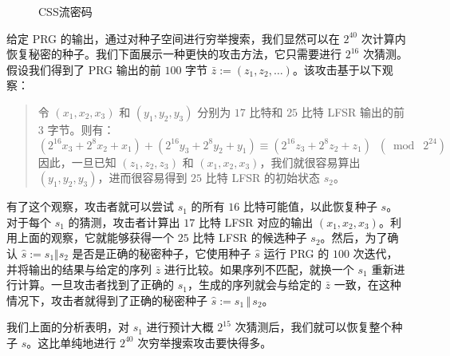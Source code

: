 \begin{figure}
	\centering
	
	\caption{CSS流密码}
	\label{fig:3-11}
\end{figure}

\begin{snote}[CSS的不安全性。]
给定 PRG 的输出，通过对种子空间进行穷举搜索，我们显然可以在 $2^{40}$ 次计算内恢复秘密的种子。我们下面展示一种更快的攻击方法，它只需要进行 $2^{16}$ 次猜测。假设我们得到了 PRG 输出的前 $100$ 字节 $\bar{z}:=(z_1,z_2,\dots)$。该攻击基于以下观察：
\begin{quote}
令 $(x_1,x_2,x_3)$ 和 $(y_1,y_2,y_3)$ 分别为 $17$ 比特和 $25$ 比特 LFSR 输出的前 $3$ 字节。则有：
\[
(2^{16}x_3+2^8x_2+x_1)+(2^{16}y_3+2^8y_2+y_1)
\equiv(2^{16}z_3+2^8z_2+z_1)\;\;(\bmod\;2^{24})
\]
因此，一旦已知 $(z_1,z_2,z_3)$ 和 $(x_1,x_2,x_3)$，我们就很容易算出 $(y_1,y_2,y_3)$，进而很容易得到 $25$ 比特 LFSR 的初始状态 $s_2$。
\end{quote}
有了这个观察，攻击者就可以尝试 $s_1$ 的所有 $16$ 比特可能值，以此恢复种子 $s$。对于每个 $s_1$ 的猜测，攻击者计算出 $17$ 比特 LFSR 对应的输出 $(x_1,x_2,x_3)$。利用上面的观察，它就能够获得一个 $25$ 比特 LFSR 的候选种子 $s_2$。然后，为了确认 $\hat{s}:=s_1\Vert s_2$ 是否是正确的秘密种子，它使用种子 $\hat{s}$ 运行 PRG 的 $100$ 次迭代，并将输出的结果与给定的序列 $\bar{z}$ 进行比较。如果序列不匹配，就换一个 $s_1$ 重新进行计算。一旦攻击者找到了正确的 $s_1$，生成的序列就会与给定的 $\bar{z}$ 一致，在这种情况下，攻击者就得到了正确的秘密种子 $\hat{s}:=s_1\,\Vert\,s_2$。

我们上面的分析表明，对 $s_1$ 进行预计大概 $2^{15}$ 次猜测后，我们就可以恢复整个种子 $s$。这比单纯地进行 $2^{40}$ 次穷举搜索攻击要快得多。
\end{snote}